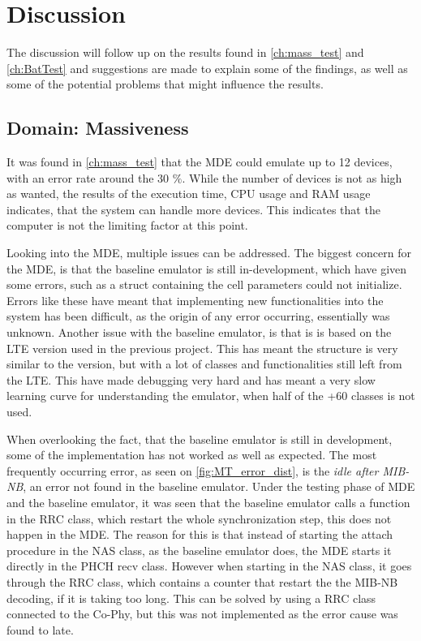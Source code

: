 \chapter{Discussion}
The discussion will follow up on the results found in \autoref{ch:mass_test} and \autoref{ch:BatTest} and suggestions are made to explain some of the findings, as well as some of the potential problems that might influence the results. 

\section{Domain: Massiveness}
It was found in \autoref{ch:mass_test} that the MDE could emulate up to 12 devices, with an error rate around the 30 $\%$. While the number of devices is not as high as wanted, the results of the execution time, CPU usage and RAM usage indicates, that the system can handle more devices. This indicates that the computer is not the limiting factor at this point. 

Looking into the MDE, multiple issues can be addressed. The biggest concern for the MDE, is that the baseline emulator is still in-development, which have given some errors, such as a struct containing the cell parameters could not initialize. Errors like these have meant that implementing new functionalities into the system has been difficult, as the origin of any error occurring, essentially was unknown. Another issue with the baseline emulator, is that is is based on the LTE version used in the previous project. This has meant the structure is very similar to the version, but with a lot of classes and functionalities still left from the LTE. This have made debugging very hard and has meant a very slow learning curve for understanding the emulator, when half of the +60 classes is not used.

When overlooking the fact, that the baseline emulator is still in development, some of the implementation has not worked as well as expected. The most frequently occurring error, as seen on \autoref{fig:MT_error_dist}, is the \textit{idle after MIB-NB}, an error not found in the baseline emulator. Under the testing phase of MDE and the baseline emulator, it was seen that the baseline emulator calls a function in the RRC class, which restart the whole synchronization step, this does not happen in the MDE. The reason for this is that instead of starting the attach procedure in the NAS class, as the baseline emulator does, the MDE starts it directly in the PHCH recv class. However when starting in the NAS class, it goes through the RRC class, which contains a counter that restart the the MIB-NB decoding, if it is taking too long. This can be solved by using a RRC class connected to the Co-Phy, but this was not implemented as the error cause was found to late.

